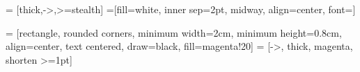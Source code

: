 \documentclass[sigconf]{acmart}
\begin{document}
 = [thick,->,>=stealth]
=[fill=white, inner sep=2pt, midway, align=center, font=\scriptsize]

 = [rectangle, rounded corners, minimum width=2cm, minimum height=0.8cm, align=center, text centered, draw=black, fill=magenta!20]
 = [->, thick, magenta, shorten >=1pt]






% 









\end{document}
